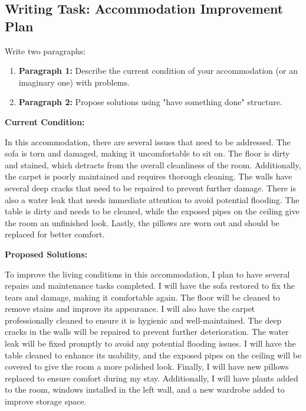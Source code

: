 \subsection{Writing Task: Accommodation Improvement Plan}

Write two paragraphs:
\begin{enumerate}
    \item \textbf{Paragraph 1:} Describe the current condition of your accommodation (or an imaginary one) with problems.
    \item \textbf{Paragraph 2:} Propose solutions using "have something done" structure.
\end{enumerate}

\begin{tcolorbox}[colback=green!5, colframe=green!30, title=Sample Essay]
\textbf{Current Condition:}

In this accommodation, there are several issues that need to be addressed. The sofa is torn and damaged, making it uncomfortable to sit on. The floor is dirty and stained, which detracts from the overall cleanliness of the room. Additionally, the carpet is poorly maintained and requires thorough cleaning. The walls have several deep cracks that need to be repaired to prevent further damage. There is also a water leak that needs immediate attention to avoid potential flooding. The table is dirty and needs to be cleaned, while the exposed pipes on the ceiling give the room an unfinished look. Lastly, the pillows are worn out and should be replaced for better comfort.

\textbf{Proposed Solutions:}

To improve the living conditions in this accommodation, I plan to have several repairs and maintenance tasks completed. I will have the sofa restored to fix the tears and damage, making it comfortable again. The floor will be cleaned to remove stains and improve its appearance. I will also have the carpet professionally cleaned to ensure it is hygienic and well-maintained. The deep cracks in the walls will be repaired to prevent further deterioration. The water leak will be fixed promptly to avoid any potential flooding issues. I will have the table cleaned to enhance its usability, and the exposed pipes on the ceiling will be covered to give the room a more polished look. Finally, I will have new pillows replaced to ensure comfort during my stay. Additionally, I will have plants added to the room, windows installed in the left wall, and a new wardrobe added to improve storage space.
\end{tcolorbox}

